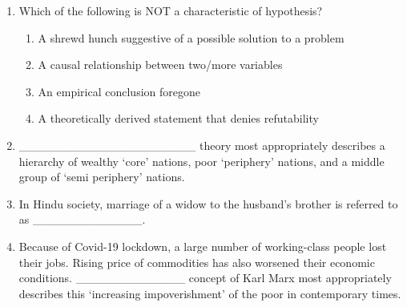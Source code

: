 \documentclass[12pt]{article}
\theoremstyle{remark}
\begin{document}
\begin{enumerate}
\begin{enumerate}
\end{enumerate}
\hfill{}
\item Which of the following is NOT a characteristic of hypothesis?
\begin{enumerate}
    \item A shrewd hunch suggestive of a possible solution to a problem 
    \item A causal relationship between two/more variables
    \item An empirical conclusion foregone 
    \item A theoretically derived statement that denies refutability 
\end{enumerate}
\hfill{}
\item \_\_\_\_\_\_\_\_\_\_\_\_\_\_\_\_\_\_\_\_\_ theory most appropriately describes a hierarchy of wealthy ‘core’ nations, poor ‘periphery’ nations, and a middle group of ‘semi periphery’ nations.
\begin{enumerate}
\end{enumerate}
\hfill{}
\item In Hindu society, marriage of a widow to the husband’s brother is referred to as \_\_\_\_\_\_\_\_\_\_\_\_\_.
\begin{enumerate}
\end{enumerate}
\hfill{}
\item Because of Covid-19 lockdown, a large number of working-class people lost their jobs. Rising price of commodities has also worsened their economic conditions. \_\_\_\_\_\_\_\_\_\_\_\_\_ concept of Karl Marx most appropriately describes this ‘increasing impoverishment’ of the poor in contemporary times.
\begin{enumerate}

\end{enumerate}
\end{enumerate}
\end{document}
